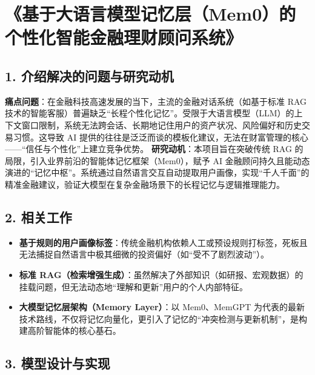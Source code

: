 \documentclass[
]{article}
\author{}
\date{}
\providecommand{\tightlist}{%
  \setlength{\itemsep}{0pt}\setlength{\parskip}{0pt}}
\begin{document}
\section{《基于大语言模型记忆层（Mem0）的个性化智能金融理财顾问系统》}\label{ux57faux4e8eux5927ux8bedux8a00ux6a21ux578bux8bb0ux5fc6ux5c42mem0ux7684ux4e2aux6027ux5316ux667aux80fdux91d1ux878dux7406ux8d22ux987eux95eeux7cfbux7edf}

\subsection{1.
介绍解决的问题与研究动机}\label{ux4ecbux7ecdux89e3ux51b3ux7684ux95eeux9898ux4e0eux7814ux7a76ux52a8ux673a}

\textbf{痛点问题}：在金融科技高速发展的当下，主流的金融对话系统（如基于标准
RAG
技术的智能客服）普遍缺乏``长程个性化记忆''。受限于大语言模型（LLM）的上下文窗口限制，系统无法跨会话、长期地记住用户的资产状况、风险偏好和历史交易习惯。这导致
AI
提供的往往是泛泛而谈的模板化建议，无法在财富管理的核心------``信任与个性化''上建立竞争优势。
\textbf{研究动机}：本项目旨在突破传统 RAG
的局限，引入业界前沿的智能体记忆框架（Mem0），赋予 AI
金融顾问持久且能动态演进的``记忆中枢''。系统通过自然语言交互自动提取用户画像，实现``千人千面''的精准金融建议，验证大模型在复杂金融场景下的长程记忆与逻辑推理能力。

\subsection{2. 相关工作}\label{ux76f8ux5173ux5de5ux4f5c}

\begin{itemize}
\tightlist
\item
  \textbf{基于规则的用户画像标签}：传统金融机构依赖人工或预设规则打标签，死板且无法捕捉自然语言中极其细微的投资偏好（如``受不了剧烈波动''）。
\item
  \textbf{标准
  RAG（检索增强生成）}：虽然解决了外部知识（如研报、宏观数据）的挂载问题，但无法动态地``理解和更新''用户的个人内部特征。
\item
  \textbf{大模型记忆层架构（Memory Layer）}：以 Mem0、MemGPT
  为代表的最新技术路线，不仅将记忆向量化，更引入了记忆的``冲突检测与更新机制''，是构建高阶智能体的核心基石。
\end{itemize}

\subsection{3.
模型设计与实现}\label{ux6a21ux578bux8bbeux8ba1ux4e0eux5b9eux73b0}
\end{document}
